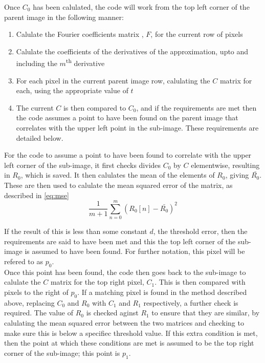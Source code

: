\documentclass[twocolumn,twoside]{article}
\numberwithin{equation}{section}
\begin{document}
Once $C_0$ has been calulated, the code will work from the top left corner of the parent image in the following manner:
\begin{enumerate}
  \item Calulate the Fourier coefficients matrix%
  , $F$, for the current row of pixels
  \item Calulate the coefficients of the derivatives of the approximation, upto and including the $m$\textsuperscript{th} derivative
  \item For each pixel in the current parent image row, calulating the $C$ matrix for each, using the appropriate value of $t$
  \item The current $C$ is then compared to $C_0$, and if the requirements are met then the code assumes a point to have been found on the parent image that correlates with the upper left point in the sub-image. These requirements are detailed below.
\end{enumerate}

For the code to assume a point to have been found to correlate with the upper left corner of the sub-image, it first checks divides $C_0$ by $C$ elementwise, resulting in $R_0$, which is saved. It then calulates the mean of the elements of $R_0$, giving $\bar{R_0}$. These are then used to calulate the mean squared error of the matrix, as described in \autoref{eq:mse}
\begin{equation}\label{eq:mse}
  \frac{1}{m+1}\sum_{n=0}^m{\left(R_0[n]-\bar{R_0}\right)^2}
\end{equation}

If the result of this is less than some constant $d$, the threshold error, then the requirements are said to have been met and this the top left corner of the sub-image is assumed to have been found. For further notation, this pixel will be refered to as $p_0$.\\

Once this point has been found, the code then goes back to the sub-image to calulate the $C$ matrix for the top right pixel, $C_1$. This is then compared with pixels to the right of $p_0$. If a matching pixel is found in the method described above, replacing $C_0$ and $R_0$ with $C_1$ and $R_1$ respectively, a further check is required. The value of $R_0$ is checked aginst $R_1$ to ensure that they are similar, by calulating the mean squared error between the two matrices and checking to make sure this is below a specifiec threshold value. If this extra condition is met, then the point at which these conditions are met is assumed to be the top right corner of the sub-image; this point is $p_1$.\\
\end{document}
